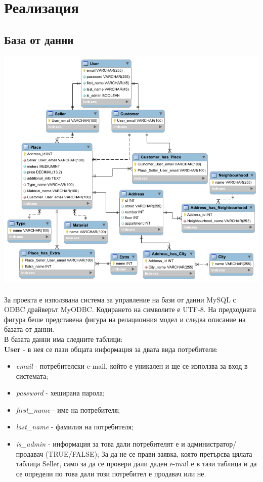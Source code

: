 \documentclass[a4paper,12pt, leqno]{article}
\begin{document}
  \section{Реализация}
    \subsection{База от данни}

\includegraphics[width=175mm]{diagram.png}
\\
\\
За проекта е използвана система за управление на бази от данни MySQL с ODBC драйверът MyODBC. Кодирането на
символите е UTF-8. На предходната фигура беше представена фигура на релационния модел и следва описание на 
базата от данни.
\\
В базата данни има следните таблици:
\\

\textbf{User} - в нея се пази общата информация за двата вида потребители:
\begin{itemize}
 \item \textit{email} - потребителски e-mail, който е уникален и ще се използва за вход в системата;
 \item \textit{password} - хеширана парола;
 \item \textit{first\_name} - име на потребителя;
 \item \textit{last\_name} - фамилия на потребителя;
 \item \textit{is\_admin} - информация за това дали потребителят е и администратор/продавач (TRUE/FALSE); За да не се прави
заявка, която претърсва цялата таблица Seller, само за да се провери дали даден e-mail е в тази таблица и да се определи
по това дали този потребител е продавач или не.
\end{itemize}
\end{document}
